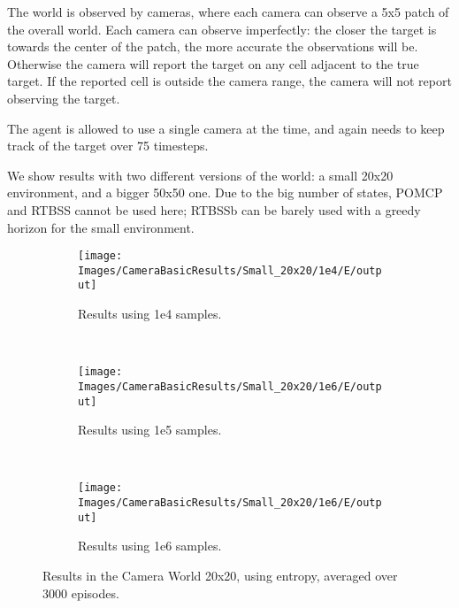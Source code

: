 The world is observed by cameras, where each camera can observe a 5x5 patch of the overall world.
Each camera can observe imperfectly: the closer the target is towards the center of the patch, the
more accurate the observations will be. Otherwise the camera will report the target on any cell
adjacent to the true target. If the reported cell is outside the camera range, the camera will not
report observing the target.

The agent is allowed to use a single camera at the time, and again needs to keep track of the target
over 75 timesteps.

We show results with two different versions of the world: a small 20x20 environment, and a bigger
50x50 one. Due to the big number of states, POMCP and RTBSS cannot be used here; RTBSSb can be
barely used with a greedy horizon for the small environment.

\begin{figure}[ht]
        \centering
        \begin{subfigure}[t]{0.3\textwidth}
                \texttt{[image: Images/CameraBasicResults/Small\_20x20/1e4/E/output]}
                \caption{Results using 1e4 samples.}
                \label{fig:cws4e}
        \end{subfigure}%
        ~ %
        \begin{subfigure}[t]{0.3\textwidth}
                \texttt{[image: Images/CameraBasicResults/Small\_20x20/1e6/E/output]}
                \caption{Results using 1e5 samples.}
                \label{fig:cws5e}
        \end{subfigure}
        ~ %
        \begin{subfigure}[t]{0.3\textwidth}
                \texttt{[image: Images/CameraBasicResults/Small\_20x20/1e6/E/output]}
                \caption{Results using 1e6 samples.}
                \label{fig:cws6e}
        \end{subfigure}
        \caption{Results in the Camera World 20x20, using entropy, averaged over 3000 episodes.}\label{fig:cwse}
\end{figure}

